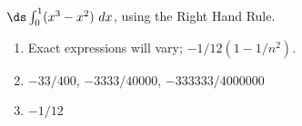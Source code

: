 {$\ds \int_{0}^{1} (x^3-x^2)\ dx$, using the Right Hand Rule.
}
{\begin{enumerate}
\item		Exact expressions will vary; $-1/12(1-1/n^2)$.
\item		$-33/400$, $-3333/40000$, $-333333/4000000$
\item		$-1/12$
\end{enumerate}
}

